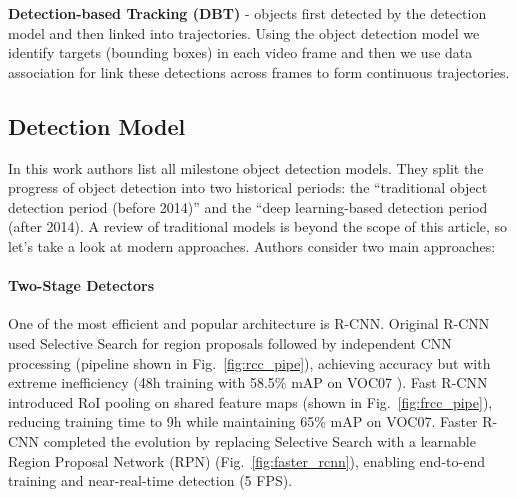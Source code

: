 \documentclass[12pt, a4paper]{article}
\begin{document}
\textbf{Detection-based Tracking (DBT)} - objects first detected by the detection model and then linked into trajectories. Using the object detection model we identify targets (bounding boxes) in each video frame and then we use data association for link these detections across frames to form continuous trajectories.

\subsection{Detection Model}

In this work \cite{detectionModelsSurvey} authors list all milestone object detection models. They split the progress of object detection 
into two historical periods: the “traditional object detection period (before 2014)” and the “deep learning-based detection period (after 2014). 
A review of traditional models is beyond the scope of this article, so let's take a look at modern approaches. Authors consider two main approaches: 

\paragraph{Two-Stage Detectors}
One of the most efficient and popular architecture is R-CNN. Original R-CNN \cite{rcnn} used Selective Search \cite{selective_serach} for region proposals followed by independent CNN processing (pipeline shown in Fig.~\ref{fig:rcc_pipe}), achieving accuracy but with extreme inefficiency (48h training with 58.5\% mAP on VOC07 \cite{voc07}). Fast R-CNN \cite{fastRCNN} introduced RoI pooling on shared feature maps (shown in Fig.~\ref{fig:frcc_pipe}), reducing training time to 9h while maintaining 65\% mAP on VOC07. Faster R-CNN \cite{fasterRCNN} completed the evolution by replacing Selective Search with a learnable Region Proposal Network (RPN) (Fig.~\ref{fig:faster_rcnn}), enabling end-to-end training and near-real-time detection (5 FPS).
\end{document}
